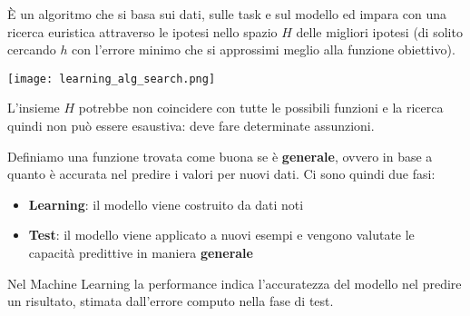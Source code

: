\begin{definition}
	È un algoritmo che si basa sui dati, sulle task e sul modello ed impara con una ricerca euristica attraverso le ipotesi nello spazio $H$ delle migliori ipotesi (di solito cercando $h$ con l'errore minimo che si approssimi meglio alla funzione obiettivo).
	\begin{center}
		\texttt{[image: learning\_alg\_search.png]}
	\end{center}
\end{definition}

\begin{note}
	L'insieme $H$ potrebbe non coincidere con tutte le possibili funzioni e la ricerca quindi non può essere esaustiva: deve fare determinate assunzioni.
\end{note}

\begin{definition}
	Definiamo una funzione trovata come buona se è \textbf{generale}, ovvero in base a quanto è accurata nel predire i valori per nuovi dati. Ci sono quindi due fasi:
	\begin{itemize}
		\item \textbf{Learning}: il modello viene costruito da dati noti
		\item \textbf{Test}: il modello viene applicato a nuovi esempi e vengono valutate le capacità predittive in maniera \textbf{generale}
	\end{itemize}
\end{definition}
\begin{note}[Performance]
	Nel Machine Learning la performance indica l'accuratezza del modello nel predire un risultato, stimata dall'errore computo nella fase di test.
\end{note}